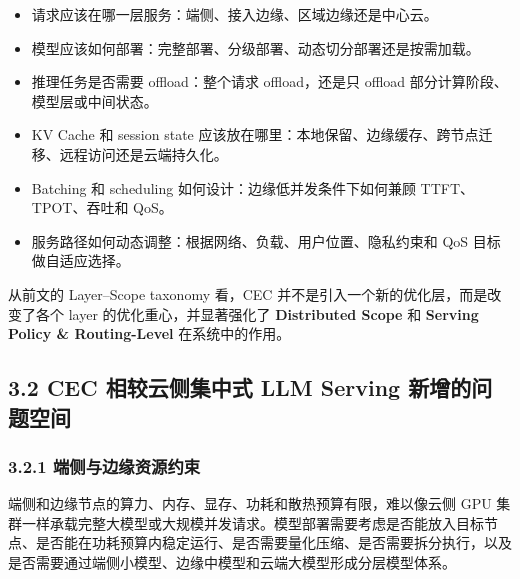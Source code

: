 \documentclass[a4paper,10pt]{ctexart}
\begin{document}
\begin{itemize}
\item 请求应该在哪一层服务：端侧、接入边缘、区域边缘还是中心云。

\item 模型应该如何部署：完整部署、分级部署、动态切分部署还是按需加载。

\item 推理任务是否需要 offload：整个请求 offload，还是只 offload 部分计算阶段、模型层或中间状态。

\item KV Cache 和 session state 应该放在哪里：本地保留、边缘缓存、跨节点迁移、远程访问还是云端持久化。

\item Batching 和 scheduling 如何设计：边缘低并发条件下如何兼顾 TTFT、TPOT、吞吐和 QoS。

\item 服务路径如何动态调整：根据网络、负载、用户位置、隐私约束和 QoS 目标做自适应选择。



\end{itemize}
从前文的 Layer–Scope taxonomy 看，CEC 并不是引入一个新的优化层，而是改变了各个 layer 的优化重心，并显著强化了 \textbf{Distributed Scope} 和 \textbf{Serving Policy \& Routing-Level} 在系统中的作用。








\subsection*{3.2 CEC 相较云侧集中式 LLM Serving 新增的问题空间}



\subsubsection*{3.2.1 端侧与边缘资源约束}



端侧和边缘节点的算力、内存、显存、功耗和散热预算有限，难以像云侧 GPU 集群一样承载完整大模型或大规模并发请求。模型部署需要考虑是否能放入目标节点、是否能在功耗预算内稳定运行、是否需要量化压缩、是否需要拆分执行，以及是否需要通过端侧小模型、边缘中模型和云端大模型形成分层模型体系。
\end{document}
